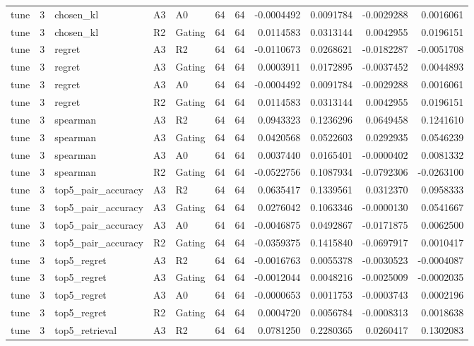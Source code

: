 \begin{tabular}{lrlllrrrrrr}
tune & 3 & chosen_kl & A3 & A0 & 64 & 64 & -0.0004492 & 0.0091784 & -0.0029288 & 0.0016061 \\
tune & 3 & chosen_kl & R2 & Gating & 64 & 64 & 0.0114583 & 0.0313144 & 0.0042955 & 0.0196151 \\
tune & 3 & regret & A3 & R2 & 64 & 64 & -0.0110673 & 0.0268621 & -0.0182287 & -0.0051708 \\
tune & 3 & regret & A3 & Gating & 64 & 64 & 0.0003911 & 0.0172895 & -0.0037452 & 0.0044893 \\
tune & 3 & regret & A3 & A0 & 64 & 64 & -0.0004492 & 0.0091784 & -0.0029288 & 0.0016061 \\
tune & 3 & regret & R2 & Gating & 64 & 64 & 0.0114583 & 0.0313144 & 0.0042955 & 0.0196151 \\
tune & 3 & spearman & A3 & R2 & 64 & 64 & 0.0943323 & 0.1236296 & 0.0649458 & 0.1241610 \\
tune & 3 & spearman & A3 & Gating & 64 & 64 & 0.0420568 & 0.0522603 & 0.0292935 & 0.0546239 \\
tune & 3 & spearman & A3 & A0 & 64 & 64 & 0.0037440 & 0.0165401 & -0.0000402 & 0.0081332 \\
tune & 3 & spearman & R2 & Gating & 64 & 64 & -0.0522756 & 0.1087934 & -0.0792306 & -0.0263100 \\
tune & 3 & top5_pair_accuracy & A3 & R2 & 64 & 64 & 0.0635417 & 0.1339561 & 0.0312370 & 0.0958333 \\
tune & 3 & top5_pair_accuracy & A3 & Gating & 64 & 64 & 0.0276042 & 0.1063346 & -0.0000130 & 0.0541667 \\
tune & 3 & top5_pair_accuracy & A3 & A0 & 64 & 64 & -0.0046875 & 0.0492867 & -0.0171875 & 0.0062500 \\
tune & 3 & top5_pair_accuracy & R2 & Gating & 64 & 64 & -0.0359375 & 0.1415840 & -0.0697917 & 0.0010417 \\
tune & 3 & top5_regret & A3 & R2 & 64 & 64 & -0.0016763 & 0.0055378 & -0.0030523 & -0.0004087 \\
tune & 3 & top5_regret & A3 & Gating & 64 & 64 & -0.0012044 & 0.0048216 & -0.0025009 & -0.0002035 \\
tune & 3 & top5_regret & A3 & A0 & 64 & 64 & -0.0000653 & 0.0011753 & -0.0003743 & 0.0002196 \\
tune & 3 & top5_regret & R2 & Gating & 64 & 64 & 0.0004720 & 0.0056784 & -0.0008313 & 0.0018638 \\
tune & 3 & top5_retrieval & A3 & R2 & 64 & 64 & 0.0781250 & 0.2280365 & 0.0260417 & 0.1302083 \\

\end{tabular}
